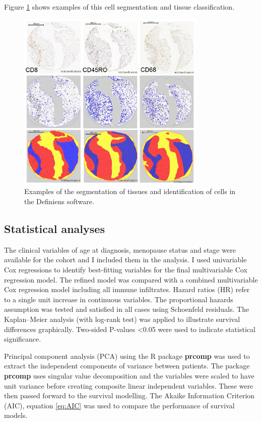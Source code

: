 Figure \ref{fig:segmentation} shows examples of this cell segmentation and tissue classification.

\begin{figure}[htbp!] 
\centering    
\includegraphics[width=0.8\textwidth]{Chapter2/Figs/Raster/Segmentation.png}
\caption[Segmentation in Definiens]{Examples of the segmentation of tissues and identification of cells in the Definiens software.}
\label{fig:segmentation}
\end{figure}

\subsection{Statistical analyses}
 The clinical variables of age at diagnosis, menopause status and stage were available for the cohort and I included them in the analysis. I used univariable Cox regressions to identify best-fitting variables for the final multivariable Cox regression model. The refined model was compared with a combined multivariable Cox regression model including all immune infiltrates. Hazard ratios (HR) refer to a single unit increase in continuous variables. The proportional hazards assumption was tested and satisfied in all cases using Schoenfeld residuals. The Kaplan–Meier analysis (with log-rank test) was applied to illustrate survival differences graphically. Two-sided P-values <0.05 were used to indicate statistical significance. 

Principal component analysis (PCA) using the R package \textbf{prcomp} was used to extract the independent components of variance between patients. The package \textbf{prcomp} uses singular value decomposition and the variables were scaled to have unit variance before creating composite linear independent variables. These were then passed forward to the survival modelling. The Akaike Information Criterion (AIC), equation \ref{eq:AIC} was used to compare the performance of survival models.

